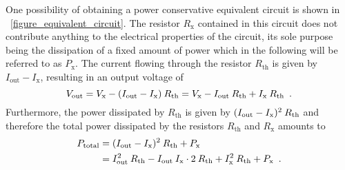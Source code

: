 \documentclass[twoside]{IEEEtran}
\newcommand{\mult}{\nonscript\:}
\newcommand{\opout}{{\operatorname{out}}}
\newcommand{\opth}{{\operatorname{th}}}
\newcommand{\optotal}{{\operatorname{total}}}
\newcommand{\opx}{{\operatorname{x}}}
\begin{document}
One possibility of obtaining a power conservative equivalent circuit is shown in \figurename~\ref{figure_equivalent_circuit}.
The resistor $R_{\opx}$ contained in this circuit does not contribute anything to the electrical properties of the circuit, its sole purpose being the dissipation of a fixed amount of power which in the following will be referred to as $P_{\opx}$.
The current flowing through the resistor $R_{\opth}$ is given by $I_{\opout} - I_{\opx}$, resulting in an output voltage of
\begin{equation}
    V_{\opout}
  = V_{\opx} - (I_{\opout} - I_{\opx}) \mult R_{\opth}
  = V_{\opx} - I_{\opout} \mult R_{\opth} + I_{\opx} \mult R_{\opth}
  \enskip .
  \label{eq_equivalent_v_out}
\end{equation}
Furthermore, the power dissipated by $R_{\opth}$ is given by $(I_{\opout} - I_{\opx})^{2} \mult R_{\opth}$ and therefore the total power dissipated by the resistors $R_{\opth}$ and $R_{\opx}$ amounts to
\begin{align}
                   P_{\optotal}
               & = (I_{\opout} - I_{\opx})^{2} \mult R_{\opth} + P_{\opx}
  \nonumber \\ & = I_{\opout}^{2} \mult R_{\opth} - I_{\opout} \mult I_{\opx} \cdot 2 \mult R_{\opth} + I_{\opx}^{2} \mult R_{\opth} + P_{\opx}
  \enskip .
  \label{eq_equivalent_p_total}
\end{align}
\end{document}
